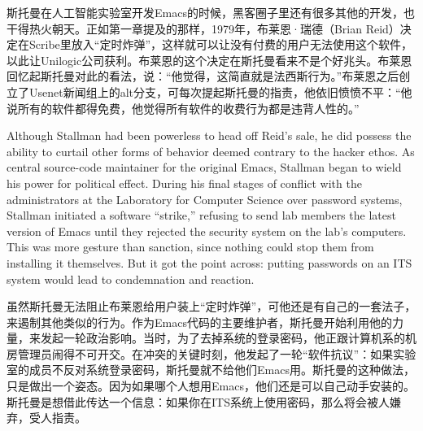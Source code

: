 \ifdefined\chs
斯托曼在人工智能实验室开发Emacs的时候，黑客圈子里还有很多其他的开发，也干得热火朝天。正如第一章提及的那样，1979年，布莱恩·瑞德（Brian Reid）决定在Scribe里放入``定时炸弹''，这样就可以让没有付费的用户无法使用这个软件，以此让Unilogic公司获利。布莱恩的这个决定在斯托曼看来不是个好兆头。布莱恩回忆起斯托曼对此的看法，说：``他觉得，这简直就是法西斯行为。''布莱恩之后创立了Usenet新闻组上的alt分支，可每次提起斯托曼的指责，他依旧愤愤不平：``他说所有的软件都得免费，他觉得所有软件的收费行为都是违背人性的。''
\fi

\ifdefined\eng
Although Stallman had been powerless to head off Reid's sale, he did possess the ability to curtail other forms of behavior deemed contrary to the hacker ethos. As central source-code maintainer for the original Emacs, Stallman began to wield his power for political effect. During his final stages of conflict with the administrators at the Laboratory for Computer Science over password systems, Stallman initiated a software ``strike,'' refusing to send lab members the latest version of Emacs until they rejected the security system on the lab's computers. This was more gesture than sanction, since nothing could stop them from installing it themselves. But it got the point across: putting passwords on an ITS system would lead to condemnation and reaction.
\fi

\ifdefined\chs
虽然斯托曼无法阻止布莱恩给用户装上``定时炸弹''，可他还是有自己的一套法子，来遏制其他类似的行为。作为Emacs代码的主要维护者，斯托曼开始利用他的力量，来发起一轮政治影响。当时，为了去掉系统的登录密码，他正跟计算机系的机房管理员闹得不可开交。在冲突的关键时刻，他发起了一轮``软件抗议''：如果实验室的成员不反对系统登录密码，斯托曼就不给他们Emacs用。斯托曼的这种做法，只是做出一个姿态。因为如果哪个人想用Emacs，他们还是可以自己动手安装的。斯托曼是想借此传达一个信息：如果你在ITS系统上使用密码，那么将会被人嫌弃，受人指责。
\fi

